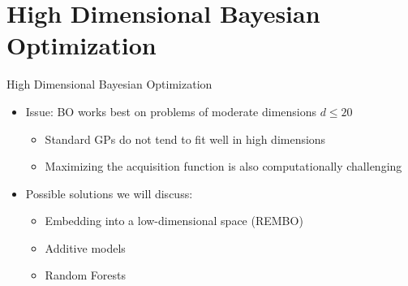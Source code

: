 \section{High Dimensional Bayesian Optimization}
\begin{frame}[c]{High Dimensional Bayesian Optimization}
\begin{itemize}
    \item Issue: BO works best on problems of moderate dimensions $d\leq20$
    \begin{itemize}
        \item Standard GPs do not tend to fit well in high dimensions
        \item Maximizing the acquisition function is also computationally challenging
    \end{itemize}
\medskip
\pause

    \item Possible solutions we will discuss:
    \begin{itemize}
        \item Embedding into a low-dimensional space (REMBO) 
        \item Additive models 
        \item Random Forests 
    \end{itemize}
\end{itemize}


\end{frame}


